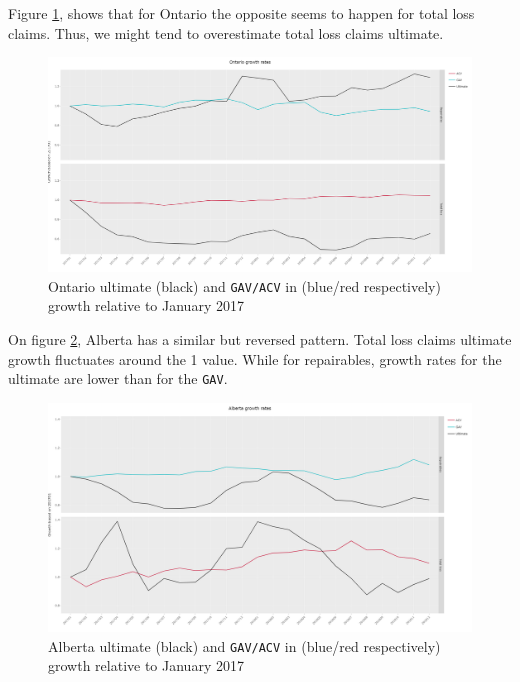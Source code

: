 	Figure \ref{Fig_ON_growth}, shows that for Ontario the opposite seems to happen for total loss claims. Thus, we might tend to overestimate total loss claims ultimate.
	\begin{figure}[H]
		\begin{center}
			\includegraphics[scale=0.14]{Graphiques/ON_growth} 
			\renewcommand{\figurename}{Figure}
			\caption[Ontario ultimate and \texttt{GAV/ACV} growth]{Ontario ultimate (black) and \texttt{GAV/ACV} in (blue/red respectively) growth relative to January 2017}\label{Fig_ON_growth}
		\end{center}
	\end{figure}
	On figure \ref{Fig_AB_growth}, Alberta has a similar but reversed pattern. Total loss claims ultimate growth fluctuates around the 1 value. While for repairables, growth rates for the ultimate are lower than for the \texttt{GAV}.  
	\begin{figure}[H]
		\begin{center}
			\includegraphics[scale=0.14]{Graphiques/AB_growth} 
			\renewcommand{\figurename}{Figure}
			\caption[Alberta ultimate and \texttt{GAV/ACV} growth]{Alberta ultimate (black) and \texttt{GAV/ACV} in (blue/red respectively) growth relative to January 2017}\label{Fig_AB_growth}
		\end{center}
	\end{figure}

